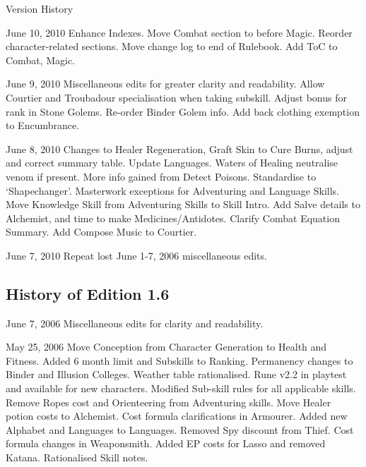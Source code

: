 \begin{Chapter}{Version History}
\begin{Description}
\item[June 10, 2010] Enhance Indexes.  Move Combat section to before
  Magic.  Reorder character-related sections.  Move change log to end
  of Rulebook.  Add ToC to Combat, Magic.

\item[June 9, 2010] Miscellaneous edits for greater clarity and
  readability.  Allow Courtier and Troubadour specialisation when
  taking subskill.  Adjust bonus for rank in Stone Golems. Re-order
  Binder Golem info.  Add back clothing exemption to Encumbrance.

\item[June 8, 2010] Changes to Healer Regeneration, Graft Skin to Cure
  Burns, adjust and correct summary table.  Update Languages.
  Waters of Healing neutralise venom if present. More info gained from
  Detect Poisons.  Standardise to ‘Shapechanger’.  Masterwork
  exceptions for Adventuring and Language Skills. Move Knowledge Skill
  from Adventuring Skills to Skill Intro.  Add Salve details to
  Alchemist, and time to make Medicines/Antidotes.  Clarify Combat
  Equation Summary.  Add Compose Music to Courtier.

\item[June 7, 2010] Repeat lost June 1-7, 2006 miscellaneous edits.

\end{Description}

\subsection{History of Edition 1.6}

\begin{Description}

\item[June 7, 2006] Miscellaneous edits for clarity and readability.

\item[May 25, 2006] Move Conception from Character Generation to
  Health and Fitness.  Added 6 month limit and Subskills to Ranking.
  Permanency changes to Binder and Illusion Colleges.  Weather table
  rationalised. Rune v2.2 in playtest and available for new
  characters.  Modified Sub-skill rules for all applicable skills.
  Remove Ropes cost and Orienteering from Adventuring skills. Move
  Healer potion costs to Alchemist.  Cost formula clarifications in
  Armourer.  Added new Alphabet and Languages to Languages.  Removed
  Spy discount from Thief.  Cost formula changes in Weaponsmith.
  Added EP costs for Lasso and removed Katana.  Rationalised Skill
  notes.


\end{Description}
\end{Chapter}
